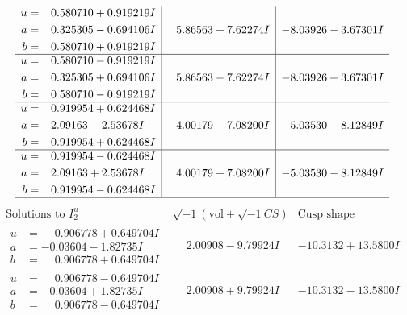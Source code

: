 \documentclass[1p]{elsarticle_modified}
\theoremstyle{definition}
\newcommand{\I}{\sqrt{-1}}
\begin{document}
$$\begin{array}{c|c|c}
\begin{aligned}
u &= \phantom{-}0.580710 + 0.919219 I \\
a &= \phantom{-}0.325305 - 0.694106 I \\
b &= \phantom{-}0.580710 + 0.919219 I\end{aligned}
 & \phantom{-}5.86563 + 7.62274 I & -8.03926 - 3.67301 I \\ \hline\begin{aligned}
u &= \phantom{-}0.580710 - 0.919219 I \\
a &= \phantom{-}0.325305 + 0.694106 I \\
b &= \phantom{-}0.580710 - 0.919219 I\end{aligned}
 & \phantom{-}5.86563 - 7.62274 I & -8.03926 + 3.67301 I \\ \hline\begin{aligned}
u &= \phantom{-}0.919954 + 0.624468 I \\
a &= \phantom{-}2.09163 - 2.53678 I \\
b &= \phantom{-}0.919954 + 0.624468 I\end{aligned}
 & \phantom{-}4.00179 - 7.08200 I & -5.03530 + 8.12849 I \\ \hline\begin{aligned}
u &= \phantom{-}0.919954 - 0.624468 I \\
a &= \phantom{-}2.09163 + 2.53678 I \\
b &= \phantom{-}0.919954 - 0.624468 I\end{aligned}
 & \phantom{-}4.00179 + 7.08200 I & -5.03530 - 8.12849 I\\
 \hline 
 \end{array}$$\newpage$$\begin{array}{c|c|c}  
\text{Solutions to }I^u_{2}& \I (\text{vol} + \sqrt{-1}CS) & \text{Cusp shape}\\
 \hline 
\begin{aligned}
u &= \phantom{-}0.906778 + 0.649704 I \\
a &= -0.03604 - 1.82735 I \\
b &= \phantom{-}0.906778 + 0.649704 I\end{aligned}
 & \phantom{-}2.00908 - 9.79924 I & -10.3132 + 13.5800 I \\ \hline\begin{aligned}
u &= \phantom{-}0.906778 - 0.649704 I \\
a &= -0.03604 + 1.82735 I \\
b &= \phantom{-}0.906778 - 0.649704 I\end{aligned}
 & \phantom{-}2.00908 + 9.79924 I & -10.3132 - 13.5800 I \\ \hline\begin{aligned}

\end{aligned}
\end{array}$$
\end{document}
